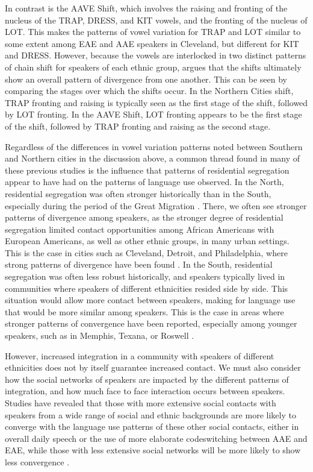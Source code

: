 \documentclass[output=paper,colorlinks,citecolor=brown]{langscibook}
\begin{document}
In contrast is the AAVE Shift, which involves the raising and fronting of the nucleus of the TRAP, DRESS, and KIT vowels, and the fronting of the nucleus of LOT. This makes the patterns of vowel variation for TRAP and LOT similar to some extent among EAE and AAE speakers in Cleveland, but different for KIT and DRESS. However, because the vowels are interlocked in two distinct patterns of chain shift for speakers of each ethnic group, \citet{Thomas2007phonological} argues that the shifts ultimately show an overall pattern of divergence from one another. This can be seen by comparing the stages over which the shifts occur. In the Northern Cities shift, TRAP fronting and raising is typically seen as the first stage of the shift, followed by LOT fronting. In the AAVE Shift, LOT fronting appears to be the first stage of the shift, followed by TRAP fronting and raising as the second stage.

 Regardless of the differences in vowel variation patterns noted between Southern and Northern cities in the discussion above, a common thread found in many of these previous studies is the influence that patterns of residential segregation appear to have had on the patterns of language use observed. In the North, residential segregation was often stronger historically than in the South, especially during the period of the Great Migration \citep{lemann1991promised,collins2020great}. There, we often see stronger patterns of divergence among speakers, as the stronger degree of residential segregation limited contact opportunities among African Americans with European Americans, as well as other ethnic groups, in many urban settings. This is the case in cities such as Cleveland, Detroit, and Philadelphia, where strong patterns of divergence have been found \citep{Thomas2007phonological,anderson2002dialect,LabovHarris1986}. In the South, residential segregation was often less robust historically, and speakers typically lived in communities where speakers of different ethnicities resided side by side. This situation would allow more contact between speakers, making for language use that would be more similar among speakers. This is the case in areas where stronger patterns of convergence have been reported, especially among younger speakers, such as in Memphis, Texana, or Roswell \citep{FridlandBartlett2006,childscarpenter2010,andres2009african}.

 However, increased integration in a community with speakers of different ethnicities does not by itself guarantee increased contact. We must also consider how the social networks of speakers are impacted by the different patterns of integration, and how much face to face interaction occurs between speakers. Studies have revealed that those with more extensive social contacts with speakers from a wide range of social and ethnic backgrounds are more likely to converge with the language use patterns of these other social contacts, either in overall daily speech or the use of more elaborate codeswitching between AAE and EAE, while those with less extensive social networks will be more likely to show less convergence \citep{LabovHarris1986,childscarpenter2010,britt2015african}.
\end{document}
